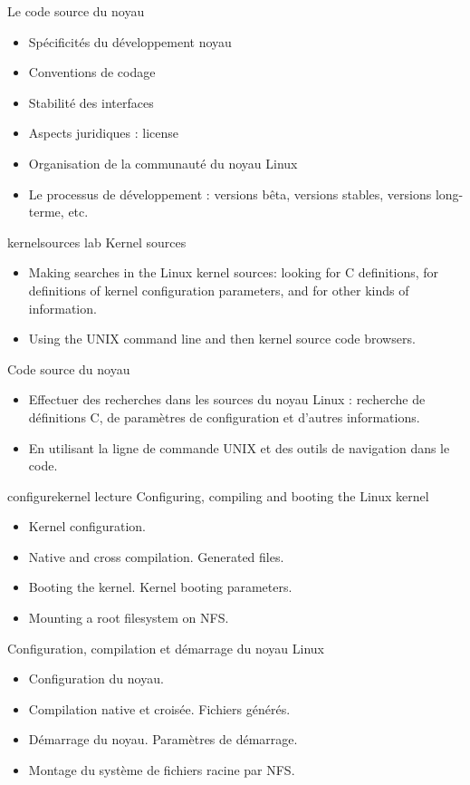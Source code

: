 {Le code source du noyau}
{
  \begin{itemize}
  \item Spécificités du développement noyau
  \item Conventions de codage
  \item Stabilité des interfaces
  \item Aspects juridiques : license
  \item Organisation de la communauté du noyau Linux
  \item Le processus de développement : versions bêta, versions stables,
    versions long-terme, etc.
 \end{itemize}
}
{kernelsources}
{lab}
{Kernel sources}
{
  \begin{itemize}
  \item Making searches in the Linux kernel sources: looking for C
    definitions, for definitions of kernel configuration parameters,
    and for other kinds of information.
  \item Using the UNIX command line and then kernel source code
    browsers.
 \end{itemize}
}
{Code source du noyau}
{
  \begin{itemize}
  \item Effectuer des recherches dans les sources du noyau Linux :
    recherche de définitions C, de paramètres de configuration et d'autres
    informations.
  \item En utilisant la ligne de commande UNIX et des outils de
    navigation dans le code.
 \end{itemize}
}
{configurekernel}
{lecture}
{Configuring, compiling and booting the Linux kernel}
{
  \begin{itemize}
  \item Kernel configuration.
  \item Native and cross compilation. Generated files.
  \item Booting the kernel. Kernel booting parameters.
  \item Mounting a root filesystem on NFS.
  \end{itemize}
}
{Configuration, compilation et démarrage du noyau Linux}
{
  \begin{itemize}
  \item Configuration du noyau.
  \item Compilation native et croisée. Fichiers générés.
  \item Démarrage du noyau. Paramètres de démarrage.
  \item Montage du système de fichiers racine par NFS.
  \end{itemize}
}
